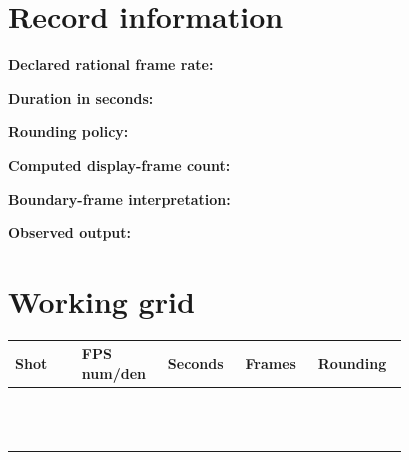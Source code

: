 \documentclass[10pt,letterpaper]{article}
\begin{document}
\makedoctitle
\makedocsummary

\section{Record information}
\noindent\textbf{Declared rational frame rate:}\quad\hrulefill\par\vspace{10pt}
\noindent\textbf{Duration in seconds:}\quad\hrulefill\par\vspace{10pt}
\noindent\textbf{Rounding policy:}\quad\hrulefill\par\vspace{10pt}
\noindent\textbf{Computed display-frame count:}\quad\hrulefill\par\vspace{10pt}
\noindent\textbf{Boundary-frame interpretation:}\quad\hrulefill\par\vspace{10pt}
\noindent\textbf{Observed output:}\quad\hrulefill\par\vspace{10pt}\section{Working grid}
\begin{longtable}{|p{0.156\linewidth}|p{0.156\linewidth}|p{0.156\linewidth}|p{0.156\linewidth}|p{0.156\linewidth}|}
\hline
\textbf{Shot} & \textbf{FPS num/den} & \textbf{Seconds} & \textbf{Frames} & \textbf{Rounding}\\\hline
\endhead
\rule{0pt}{20pt} &  &  &  & \\\hline
\rule{0pt}{20pt} &  &  &  & \\\hline
\rule{0pt}{20pt} &  &  &  & \\\hline
\rule{0pt}{20pt} &  &  &  & \\\hline
\rule{0pt}{20pt} &  &  &  & \\\hline
\rule{0pt}{20pt} &  &  &  & \\\hline
\rule{0pt}{20pt} &  &  &  & \\\hline
\rule{0pt}{20pt} &  &  &  & \\\hline
\rule{0pt}{20pt} &  &  &  & \\\hline
\rule{0pt}{20pt} &  &  &  & \\\hline
\rule{0pt}{20pt} &  &  &  & \\\hline
\rule{0pt}{20pt} &  &  &  & \\\hline
\end{longtable}
\end{document}
